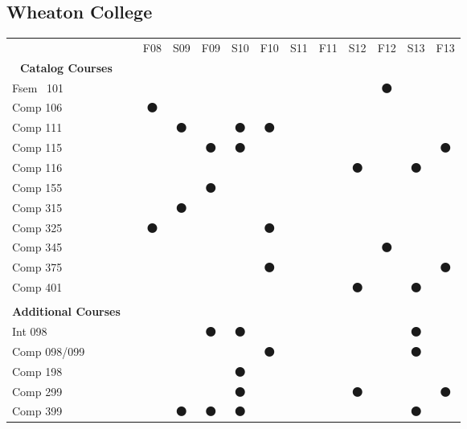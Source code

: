\documentclass[12pt]{article}
\begin{document}
\subsection*{Wheaton College}
\vspace{-0.2in}
\begin{table}[h]
\centering
\begin{tabular}{lcccccccccccc}
\toprule
 & & F08 & S09 & F09 & S10 & F10 & S11 & F11 & S12 & F12 & S13 & F13   \\
\cmidrule[\heavyrulewidth]{3-13} 
 \multicolumn{1}{c}{{\bf Catalog Courses}}\\
\cmidrule{1-1}
  {\sc Fsem} ~101  && & & & & & & & & $\medbullet$\\
  {\sc Comp} 106  & & $\medbullet$ & & & & & & & \\
  {\sc Comp} 111  && & $\medbullet$ & & $\medbullet$ & $\medbullet$ & & & & \\
  {\sc Comp} 115    && & & $\medbullet$ & $\medbullet$ & & & & & & & $\medbullet$\\
  {\sc Comp} 116   && & & & & & & & $\medbullet$ &&$\medbullet$\\
  {\sc Comp} 155    && & & $\medbullet$& & \\
  {\sc Comp} 315   && & $\medbullet$ & & & \\
  {\sc Comp} 325  && $\medbullet$ & & & & $\medbullet$ \\
  {\sc Comp} 345  & & & & & & & & & & $\medbullet$\\
  {\sc Comp} 375   && & & & & $\medbullet$ & & & & & & $\medbullet$\\
  {\sc Comp} 401   && & & & & & & & $\medbullet$ & & $\medbullet$\\
& \\
\multicolumn{1}{c}{{\bf Additional Courses}} & \\
\cmidrule{1-1}
  {\sc Int} 098  && & & $\medbullet$ & $\medbullet$ & &&&&& $\medbullet$\\
  {\sc Comp} 098/099  && & & & & $\medbullet$ &&&&&$\medbullet$\\
  {\sc Comp} 198  && & & & $\medbullet$ & &&&&&\\
  {\sc Comp} 299  && & & & $\medbullet$ & &&&$\medbullet$ & & & $\medbullet$\\
  {\sc Comp} 399  && & $\medbullet$ & $\medbullet$ & $\medbullet$ & & & & & & $\medbullet$\\
\bottomrule
\end{tabular}
\end{table}
\vspace{-0.25in}
\end{document}
